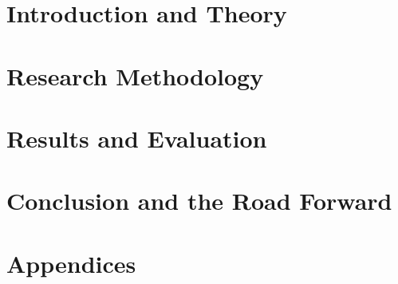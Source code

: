 \documentclass[12pt,a4paper,twoside,openright]{report}
\begin{document}

%
%
%
%
%
%
%
%
%
%
%
%
%


\cleardoublepage

\cleardoublepage

\cleardoublepage
{}


\setcounter{tocdepth}{1}
\dominitoc
\dominilof
\dominilot
\tableofcontents
\clearpage
\listoffigures
\listoftables


\part{Introduction and Theory}


\part{Research Methodology}

\part{Results and Evaluation}


\part{Conclusion and the Road Forward}





\cleardoublepage
{}

\part{Appendices}

\appendix
{}



\end{document}
